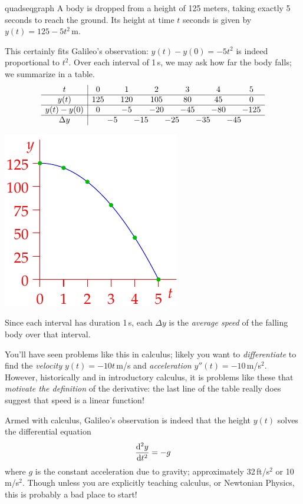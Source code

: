 \begin{example}{}{quadseqgraph}
A body is dropped from a height of 125 meters, taking exactly 5 seconds to reach the ground. Its height at time $t$ seconds is given by $y(t)=125-5t^2$\,m.\smallbreak
\begin{minipage}[t]{0.68\linewidth}\vspace{-8pt}
This certainly fits Galileo's observation: $y(t)-y(0)=-5t^2$ is indeed proportional to $t^2$.\smallbreak
Over each interval of 1\,s, we may ask how far the body falls; we summarize in a table.
\[
\begin{array}{c|ccccccccccc}
t&0&&1&&2&&3&&4&&5\\\hline
y(t)&125&&120&&105&&80&&45&&0\\\hline
y(t)-y(0)&0&&-5&&-20&&-45&&-80&&-125\\\hline
\Delta y&&\makebox[0pt][c]{$-5$}&&\makebox[0pt][c]{$-15$}&&\makebox[0pt][c]{$-25$}&&\makebox[0pt][c]{$-35$}&&\makebox[0pt][c]{$-45$}
\end{array}
\]
\end{minipage}\hfill\begin{minipage}[t]{0.29\linewidth}\vspace{-25pt}
\flushright\includegraphics{poly-quad5}
\end{minipage}\medbreak
Since each interval has duration 1\,s, each $\Delta y$ is the \emph{average speed} of the falling body over that interval.
\end{example}

You'll have seen problems like this in calculus; likely you want to \emph{differentiate} to find the \emph{velocity} $y(t)=-10t$\,m/s and \emph{acceleration} $y''(t)=-10$\,m/s$^2$. However, historically and in introductory calculus, it is problems like these that \emph{motivate the definition} of the derivative: the last line of the table really does suggest that speed is a linear function!\par
Armed with calculus, Galileo's observation is indeed that the height $y(t)$ solves the differential equation
\[\diff[^2y]{t^2}=-g\]
where $g$ is the constant acceleration due to gravity; approximately 32\,ft/s$^2$ or 10\,m/s$^2$. Though unless you are explicitly teaching calculus, or Newtonian Physics, this is probably a bad place to start! 



